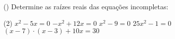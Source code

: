 \begin{question}[type=exam] () %
Determine as raízes reais das equações incompletas:

\begin{tasks}(2)
        \task $x^2-5x=0$
        \task $-x^2+12x=0$
        \task $x^2-9=0$
        \task $25x^2-1=0$
        \task $(x-7) \cdot (x-3)+10x=30$
    \end{tasks}
\end{question}
